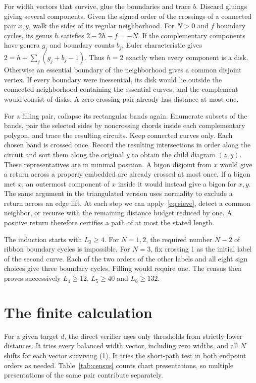 \documentclass[11pt,a4paper]{article}
\begin{document}
For width vectors that survive, glue the boundaries and trace \(b\). Discard
gluings giving several components. Given the signed order of the crossings
of a connected pair \(x,y\), walk the sides of its regular neighborhood.
For \(N>0\) and \(f\) boundary cycles, its genus \(h\) satisfies
\(2-2h-f=-N\). If the complementary components have genera \(g_j\) and
boundary counts \(b_j\), Euler characteristic gives
\(2=h+\sum_j(g_j+b_j-1)\). Thus \(h=2\) exactly when every component is a
disk. Otherwise an essential boundary of the neighborhood gives a common
disjoint vertex. If every boundary were inessential, its disk would lie
outside the connected neighborhood containing the essential curves, and the
complement would consist of disks. A zero-crossing pair already has distance
at most one.

For a filling pair, collapse its rectangular bands again. Enumerate subsets of
the bands, pair the selected sides by noncrossing chords inside each complementary
polygon, and trace the resulting circuits. Keep connected curves only. Each
chosen band is crossed once. Record the resulting intersections in order
along the circuit and sort them along the original \(y\) to obtain the
child diagram \((z,y)\). These representatives are in minimal position.
A bigon disjoint from \(x\) would give a return across a properly embedded
arc already crossed at most once. If a bigon met \(x\), an outermost component
of \(x\) inside it would instead give a bigon for \(x,y\). The same argument
in the triangulated version uses normality to exclude a return across an
edge lift. At each step we can apply~\eqref{eq:sieve}, detect a common neighbor,
or recurse with the remaining distance budget reduced by one. A positive return
therefore certifies a path of at most the stated length.

The induction starts with \(L_3\ge4\). For \(N=1,2\), the required number
\(N-2\) of ribbon boundary cycles is impossible. For \(N=3\), fix crossing
1 as the initial label of the second curve. Each of the two orders of the
other labels and all eight sign choices give three boundary cycles. Filling
would require one. The census then proves successively \(L_4\ge12\),
\(L_5\ge40\) and \(L_6\ge132\).

\clearpage
\section{The finite calculation}
For a given target \(d\), the direct verifier uses only thresholds from
strictly lower distances. It tries every balanced width vector, including
zero widths, and all \(N\) shifts for each vector surviving (1). It tries the
short-path test in both endpoint orders as needed. Table~\ref{tab:census}
counts chart presentations, so multiple presentations of the same pair
contribute separately.
\end{document}
